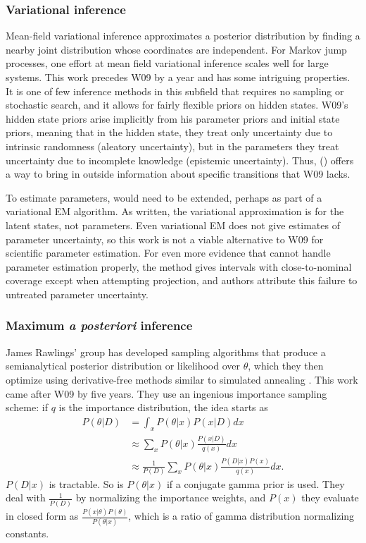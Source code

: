 \documentclass{article}
\begin{document}
\subsubsection{Variational inference}
Mean-field variational inference approximates a posterior distribution by finding a nearby joint distribution whose coordinates are independent. For Markov jump processes, one effort at mean field variational inference \cite{opper2008variational} scales well for large systems. This work precedes W09 by a year and has some intriguing properties. It is one of few inference methods in this subfield that requires no sampling or stochastic search, and it allows for fairly flexible priors on hidden states. W09's hidden state priors arise implicitly from his parameter priors and initial state priors, meaning that in the hidden state, they treat only uncertainty due to intrinsic randomness (aleatory uncertainty), but in the parameters they treat uncertainty due to incomplete knowledge (epistemic uncertainty). Thus, (\cite{opper2008variational}) offers a way to bring in outside information about specific transitions that W09 lacks.

To estimate parameters, \cite{opper2008variational} would need to be extended, perhaps as part of a variational EM algorithm. As written, the variational approximation is for the latent states, not parameters. Even variational EM does not give estimates of parameter uncertainty, so this work is not a viable alternative to W09 for scientific parameter estimation. For even more evidence that \cite{opper2008variational} cannot handle parameter estimation properly, the method gives intervals with close-to-nominal coverage except when attempting projection, and authors attribute this failure to untreated parameter uncertainty. 

\subsubsection{Maximum \textit{\textbf{ a posteriori}} inference}
James Rawlings' group has developed sampling algorithms that produce a semianalytical posterior distribution or likelihood over $\theta$, which they then optimize using derivative-free methods similar to simulated annealing \cite{gupta2014comparison,srivastava_rawlings2014stoch_opt}.   This work came after W09 by five years. They use an ingenious importance sampling scheme: if $q$ is the importance distribution, the idea starts as
\begin{align*}
P(\theta|D) &= \int_x P(\theta|x)P(x|D) dx\\
&\approx \sum_x P(\theta|x)\frac{P(x|D)}{q(x)} dx\\
&\approx \frac{1}{P(D)}\sum_x P(\theta|x)\frac{P(D|x)P(x)}{q(x)} dx.
\end{align*}
$P(D|x)$ is tractable. So is $P(\theta|x)$ if a conjugate gamma prior is used. They deal with $\frac{1}{P(D)}$ by normalizing the importance weights, and $P(x)$ they evaluate in closed form as $\frac{P(x|\theta)P(\theta)}{P(\theta|x)}$, which is a ratio of gamma distribution normalizing constants. 
\end{document}
